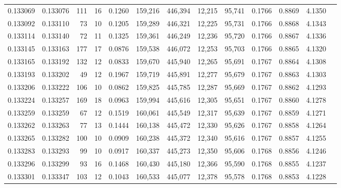 \begin{tabular}{rrrrrrrrrrrrr}
0.133069 & 0.133076 &   111 &  16 &                                     0.1260 & 159,216 & 446,394 &  12,215 &  95,741 & 0.1766 & 0.8869 & 4.1350 \\
0.133092 & 0.133110 &    73 &  10 &                                     0.1205 & 159,289 & 446,321 &  12,225 &  95,731 & 0.1766 & 0.8868 & 4.1343 \\
0.133114 & 0.133140 &    72 &  11 &                                     0.1325 & 159,361 & 446,249 &  12,236 &  95,720 & 0.1766 & 0.8867 & 4.1336 \\
0.133145 & 0.133163 &   177 &  17 &                                     0.0876 & 159,538 & 446,072 &  12,253 &  95,703 & 0.1766 & 0.8865 & 4.1320 \\
0.133165 & 0.133192 &   132 &  12 &                                     0.0833 & 159,670 & 445,940 &  12,265 &  95,691 & 0.1767 & 0.8864 & 4.1308 \\
0.133193 & 0.133202 &    49 &  12 &                                     0.1967 & 159,719 & 445,891 &  12,277 &  95,679 & 0.1767 & 0.8863 & 4.1303 \\
0.133206 & 0.133222 &   106 &  10 &                                     0.0862 & 159,825 & 445,785 &  12,287 &  95,669 & 0.1767 & 0.8862 & 4.1293 \\
0.133224 & 0.133257 &   169 &  18 &                                     0.0963 & 159,994 & 445,616 &  12,305 &  95,651 & 0.1767 & 0.8860 & 4.1278 \\
0.133259 & 0.133259 &    67 &  12 &                                     0.1519 & 160,061 & 445,549 &  12,317 &  95,639 & 0.1767 & 0.8859 & 4.1271 \\
0.133262 & 0.133263 &    77 &  13 &                                     0.1444 & 160,138 & 445,472 &  12,330 &  95,626 & 0.1767 & 0.8858 & 4.1264 \\
0.133265 & 0.133282 &   100 &  10 &                                     0.0909 & 160,238 & 445,372 &  12,340 &  95,616 & 0.1767 & 0.8857 & 4.1255 \\
0.133283 & 0.133293 &    99 &  10 &                                     0.0917 & 160,337 & 445,273 &  12,350 &  95,606 & 0.1768 & 0.8856 & 4.1246 \\
0.133296 & 0.133299 &    93 &  16 &                                     0.1468 & 160,430 & 445,180 &  12,366 &  95,590 & 0.1768 & 0.8855 & 4.1237 \\
0.133301 & 0.133347 &   103 &  12 &                                     0.1043 & 160,533 & 445,077 &  12,378 &  95,578 & 0.1768 & 0.8853 & 4.1228 \\

\end{tabular}
